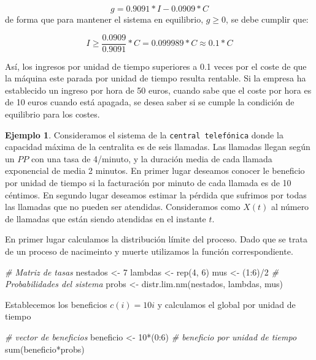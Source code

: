 \documentclass[
]{book}
\newenvironment{Shaded}{\begin{snugshade}}{\end{snugshade}}
\newcommand{\CommentTok}[1]{\textcolor[rgb]{0.56,0.35,0.01}{\textit{#1}}}
\newcommand{\DecValTok}[1]{\textcolor[rgb]{0.00,0.00,0.81}{#1}}
\newcommand{\FunctionTok}[1]{\textcolor[rgb]{0.00,0.00,0.00}{#1}}
\newcommand{\NormalTok}[1]{#1}
\newcommand{\OtherTok}[1]{\textcolor[rgb]{0.56,0.35,0.01}{#1}}
\newcommand{\SpecialCharTok}[1]{\textcolor[rgb]{0.00,0.00,0.00}{#1}}
\theoremstyle{definition}
\theoremstyle{definition}
\newtheorem{example}{Ejemplo}[chapter]
\theoremstyle{definition}
\theoremstyle{definition}
\theoremstyle{remark}
\begin{document}
\[ g = 0.9091*I - 0.0909*C\] de forma que para mantener el sistema en equilibrio, \(g \geq 0\), se debe cumplir que:

\[I \geq \frac{0.0909}{0.9091}*C = 0.099989*C \approx 0.1*C\]

Así, los ingresos por unidad de tiempo superiores a 0.1 veces por el coste de que la máquina este parada por unidad de tiempo resulta rentable. Si la empresa ha establecido un ingreso por hora de 50 euros, cuando sabe que el coste por hora es de 10 euros cuando está apagada, se desea saber si se cumple la condición de equilibrio para los costes.

\begin{example}
Consideramos el sistema de la \texttt{central\ telefónica} donde la capacidad máxima de la centralita es de seis llamadas. Las llamadas llegan según un \(PP\) con una tasa de 4/minuto, y la duración media de cada llamada exponencial de media 2 minutos. En primer lugar deseamos conocer le beneficio por unidad de tiempo si la facturación por minuto de cada llamada es de 10 céntimos. En segundo lugar deseamos estimar la pérdida que sufrimos por todas las llamadas que no pueden ser atendidas. Consideramos como \(X(t)\) al número de llamadas que están siendo atendidas en el instante \(t\).
\end{example}

En primer lugar calculamos la distribución límite del proceso. Dado que se trata de un proceso de nacimeinto y muerte utilizamos la función correspondiente.

\begin{Shaded}
\begin{Highlighting}[]
\CommentTok{\# Matriz de tasas}
\NormalTok{nestados }\OtherTok{\textless{}{-}} \DecValTok{7}
\NormalTok{lambdas }\OtherTok{\textless{}{-}} \FunctionTok{rep}\NormalTok{(}\DecValTok{4}\NormalTok{, }\DecValTok{6}\NormalTok{) }
\NormalTok{mus }\OtherTok{\textless{}{-}}\NormalTok{ (}\DecValTok{1}\SpecialCharTok{:}\DecValTok{6}\NormalTok{)}\SpecialCharTok{/}\DecValTok{2}
\CommentTok{\# Probabilidades del sistema}
\NormalTok{probs }\OtherTok{\textless{}{-}} \FunctionTok{distr.lim.nm}\NormalTok{(nestados, lambdas, mus)}
\end{Highlighting}
\end{Shaded}

Establecemos los beneficios \(c(i) = 10i\) y calculamos el global por unidad de tiempo

\begin{Shaded}
\begin{Highlighting}[]
\CommentTok{\# vector de beneficios}
\NormalTok{beneficio }\OtherTok{\textless{}{-}} \DecValTok{10}\SpecialCharTok{*}\NormalTok{(}\DecValTok{0}\SpecialCharTok{:}\DecValTok{6}\NormalTok{) }
\CommentTok{\# beneficio por unidad de tiempo}
\FunctionTok{sum}\NormalTok{(beneficio}\SpecialCharTok{*}\NormalTok{probs)}
\end{Highlighting}
\end{Shaded}
\end{document}
